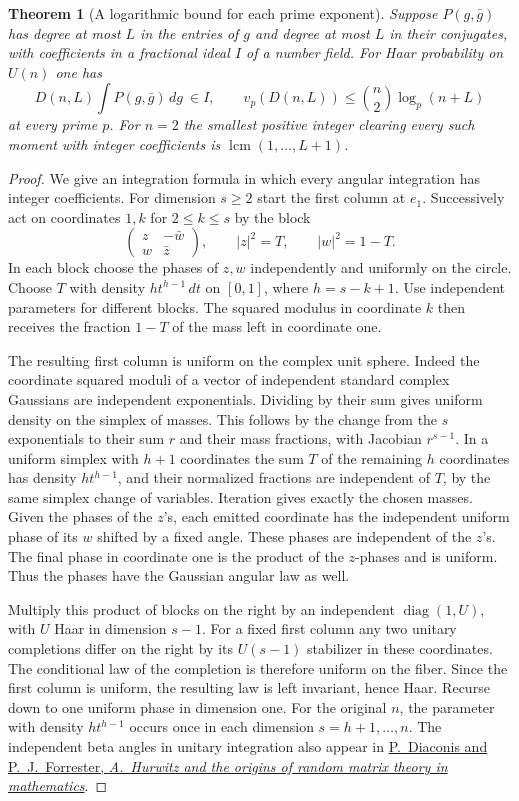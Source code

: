 \documentclass[a4paper,11pt]{article}
\newtheorem{theorem}[proposition]{Theorem}
\theoremstyle{definition}
\theoremstyle{remark}
\numberwithin{equation}{section}
\begin{document}
\begin{theorem}[A logarithmic bound for each prime exponent]\leavevmode
\label{thm:compact313}
Suppose \(P(g,\bar g)\) has degree at most \(L\) in the entries of
\(g\) and degree at most \(L\) in their conjugates, with coefficients
in a fractional ideal \(I\) of a number field. For Haar probability
on \(U(n)\) one has
\[
 D(n,L)\int P(g,\bar g)\,dg\ \in I,\qquad
 v_p(D(n,L))\le \binom n2\log_p(n+L)
\]
at every prime \(p\). For \(n=2\) the smallest positive integer
clearing every such moment with integer coefficients is
\(\operatorname{lcm}(1,\ldots,L+1)\).
\end{theorem}
\begin{proof}
We give an integration formula in which every angular integration
has integer coefficients. For dimension \(s\ge2\) start the first
column at \(e_1\). Successively act on coordinates \(1,k\) for
\(2\le k\le s\) by the block
\[
      \begin{pmatrix} z&-\bar w\\ w&\bar z\end{pmatrix},
        \qquad |z|^2=T,\qquad |w|^2=1-T .
\]
In each block choose the phases of \(z,w\) independently and
uniformly on the circle. Choose \(T\) with density
\(h t^{h-1}\,dt\) on \([0,1]\), where \(h=s-k+1\). Use independent
parameters for different blocks. The squared modulus in coordinate
\(k\) then receives the fraction \(1-T\) of the mass left in
coordinate one.

The resulting first column is uniform on the complex unit sphere.
Indeed the coordinate squared moduli of a vector of independent
standard complex Gaussians are independent exponentials. Dividing
by their sum gives uniform density on the simplex of masses. This
follows by the change from the \(s\) exponentials to their sum \(r\)
and their mass fractions, with Jacobian \(r^{s-1}\). In a uniform
simplex with \(h+1\) coordinates the sum \(T\) of the remaining
\(h\) coordinates has density \(h t^{h-1}\), and their normalized
fractions are independent of \(T\), by the same simplex change
of variables. Iteration gives exactly the chosen masses. Given
the phases of the \(z\)'s, each emitted coordinate has the
independent uniform phase of its \(w\) shifted by a fixed angle.
These phases are independent of the \(z\)'s. The final phase in
coordinate one is the product of the \(z\)-phases and is uniform.
Thus the phases have the Gaussian angular law as well.

Multiply this product of blocks on the right by an independent
\(\operatorname{diag}(1,U)\), with \(U\) Haar in dimension \(s-1\).
For a fixed first column any two unitary completions differ on
the right by its \(U(s-1)\) stabilizer in these coordinates.
The conditional law of the completion is therefore uniform on
the fiber. Since the first column is uniform, the resulting law
is left invariant, hence Haar. Recurse down to one uniform phase
in dimension one. For the original \(n\), the parameter with
density \(h t^{h-1}\) occurs once in each dimension
\(s=h+1,\ldots,n\). The independent beta angles in unitary
integration also appear in
\href{https://arxiv.org/abs/1512.09229}{P.~Diaconis and
P.~J.~Forrester, \emph{A.~Hurwitz and the origins of random
matrix theory in mathematics}}.


\end{proof}
\end{document}
